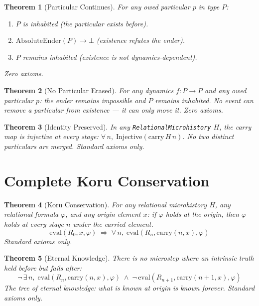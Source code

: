 \documentclass[12pt,a4paper]{article}
\newtheorem{theorem}{Theorem}[section]
\begin{document}
\begin{theorem}[Particular Continues]\label{thm:continues}
For any owed particular $p$ in type $P$:
\begin{enumerate}
    \item $P$ is inhabited (the particular exists before).
    \item $\text{AbsoluteEnder}(P) \to \bot$ (existence refutes the ender).
    \item $P$ remains inhabited (existence is not dynamics-dependent).
\end{enumerate}
Zero axioms.
\end{theorem}

\begin{theorem}[No Particular Erased]\label{thm:no-erase}
For any dynamics $f : P \to P$ and any owed particular $p$: the ender
remains impossible and $P$ remains inhabited. No event can remove a
particular from existence --- it can only move it. Zero axioms.
\end{theorem}

\begin{theorem}[Identity Preserved]\label{thm:identity}
In any \texttt{RelationalMicrohistory} $H$, the carry map is injective
at every stage: $\forall\, n,\; \text{Injective}(\text{carry}\, H\, n)$.
No two distinct particulars are merged. Standard axioms only.
\end{theorem}

\section{Complete Koru Conservation}

\begin{theorem}[Koru Conservation]\label{thm:koru}
For any relational microhistory $H$, any relational formula $\varphi$,
and any origin element $x$: if $\varphi$ holds at the origin, then
$\varphi$ holds at every stage $n$ under the carried element.
\[
\text{eval}(R_0, x, \varphi) \;\Longrightarrow\;
\forall\, n,\; \text{eval}(R_n, \text{carry}(n, x), \varphi)
\]
Standard axioms only.
\end{theorem}

\begin{theorem}[Eternal Knowledge]\label{thm:eternal}
There is no microstep where an intrinsic truth held before but fails
after:
\[
\neg\, \exists\, n,\; \text{eval}(R_n, \text{carry}(n, x), \varphi)
\;\wedge\; \neg\, \text{eval}(R_{n+1}, \text{carry}(n+1, x), \varphi)
\]
The tree of eternal knowledge: what is known at origin is known forever.
Standard axioms only.
\end{theorem}
\end{document}
